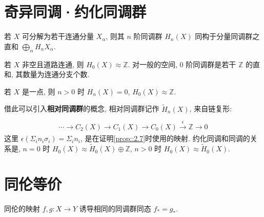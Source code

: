 \section{奇异同调·约化同调群}

\begin{proposition}[P109 2.6]
    若 $X$ 可分解为若干连通分量 $X_{\alpha}$, 则其 $n$ 阶同调群 $H_n(X)$ 同构于分量同调群之直和 $\bigoplus_{\alpha} H_n{X_{\alpha}}$.
\end{proposition}

\begin{proposition}[P109 2.7]\label{prop::2.7}
    若 $X$ 非空且道路连通, 则 $H_0(X) \approx \mathbb{Z}$. 对一般的空间, $0$ 阶同调群是若干 $\mathbb{Z}$ 的直和, 其数量为连通分支个数.
\end{proposition}

\begin{proposition}[P110 2.8]
    若 $X$ 是一点, 则 $n > 0$ 时 $H_n(X) = 0$, $H_0(X) \approx \mathbb{Z}$.
\end{proposition}

借此可以引入{\bf 相对同调群}的概念, 相对同调群记作 $\tilde{H}_n(X)$, 来自链复形:

$$
\cdots \rightarrow C_2(X) \rightarrow C_1(X) \rightarrow C_0(X) \xrightarrow[]{\epsilon} \mathbb{Z} \rightarrow 0
$$
这里 $\epsilon(\Sigma_i n_i\sigma_i) = \Sigma_i n_i$, 是在证明\autoref{prop::2.7}时使用的映射. 约化同调和同调的关系是, $n = 0$ 时 $H_0(X) \approx \tilde{H}_0(X) \oplus \mathbb{Z}$, $n > 0$ 时 $H_0(X) \approx \tilde{H}_0(X)$.

\section{同伦等价}

\begin{theorem}[P111 2.10]
    同伦的映射 $f, g\colon X \rightarrow Y$ 诱导相同的同调群同态 $f_{\ast} = g_{\ast}$. 
\end{theorem}